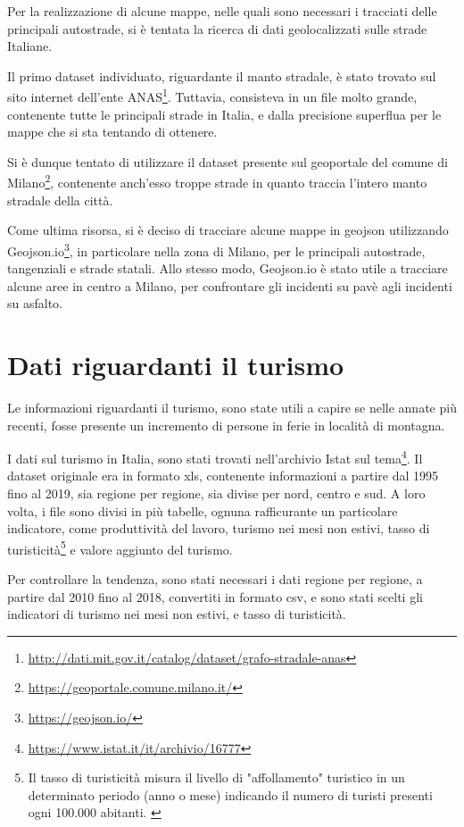 \documentclass[a4paper,12pt]{report}
\begin{document}
Per la realizzazione di alcune mappe, nelle quali sono necessari i tracciati delle principali 
autostrade, si è tentata la ricerca di dati geolocalizzati sulle strade Italiane.

Il primo dataset individuato, riguardante il manto  stradale, è stato trovato sul sito 
internet dell'ente  
ANAS\footnote{\url{http://dati.mit.gov.it/catalog/dataset/grafo-stradale-anas}}. 
Tuttavia, consisteva in un file molto grande, contenente tutte le principali 
strade in Italia, e dalla precisione superflua per le mappe che si sta tentando di ottenere.

Si è dunque tentato di utilizzare il dataset presente sul geoportale del comune di 
Milano\footnote{\url{https://geoportale.comune.milano.it/}}, 
contenente anch'esso troppe strade in quanto traccia l'intero manto stradale della città.

Come ultima risorsa, si è deciso di tracciare alcune mappe in geojson utilizzando 
Geojson.io\footnote{\url{https://geojson.io/}}, in particolare nella zona di Milano, 
per le principali autostrade, tangenziali e strade statali. 
Allo stesso modo, Geojson.io è stato utile a tracciare alcune aree in centro a Milano, 
per confrontare gli incidenti su pavè agli incidenti su asfalto.

\section{Dati riguardanti il turismo}

Le informazioni riguardanti il turismo, sono state utili a capire se nelle annate più 
recenti, fosse presente un incremento di persone in ferie in località di montagna.

I dati sul turismo in Italia, sono stati trovati nell'archivio Istat sul 
tema\footnote{\url{https://www.istat.it/it/archivio/16777}}.
Il dataset originale era in formato xls, contenente informazioni a partire dal 1995 
fino al 2019, sia regione per regione, sia divise per nord, centro e sud.
A loro volta, i file sono divisi in più tabelle, ognuna rafficurante un particolare 
indicatore, come produttività del lavoro, turismo nei mesi non estivi, 
tasso di turisticità\footnote{Il tasso di turisticità misura il livello di "affollamento" 
turistico in un determinato periodo (anno o mese) indicando il numero di turisti presenti 
ogni 100.000 abitanti. \cite{ONTIT:1}} 
e valore aggiunto del turismo.

Per controllare la tendenza, sono stati necessari i dati regione per regione, 
a partire dal 2010 fino al 2018, convertiti in formato csv, e sono stati scelti gli 
indicatori di turismo nei mesi non estivi, e tasso di turisticità. 
\end{document}
